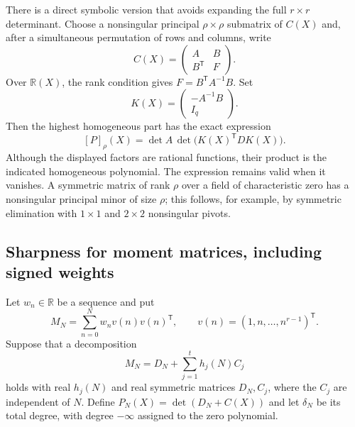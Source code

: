 There is a direct symbolic version that avoids expanding the full
$r\times r$ determinant.  Choose a nonsingular principal
$\rho\times\rho$ submatrix of $C(X)$ and, after a simultaneous
permutation of rows and columns, write
\[
 C(X)=\begin{pmatrix} A&B\\B^{\mathsf T}&F\end{pmatrix}.
\]
Over $\mathbb R(X)$, the rank condition gives $F=B^{\mathsf T}A^{-1}B$.
Set
\begin{equation}\label{deg:generic-kernel}
 K(X)=\begin{pmatrix}-A^{-1}B\\I_q\end{pmatrix}.
\end{equation}
Then the highest homogeneous part has the exact expression
\begin{equation}\label{deg:highest}
 [P]_{\rho}(X)=\det A\,
                  \det\bigl(K(X)^{\mathsf T}DK(X)\bigr).
\end{equation}
Although the displayed factors are rational functions, their product is
the indicated homogeneous polynomial.  The expression remains valid
when it vanishes.  A symmetric matrix of rank $\rho$ over a field of
characteristic zero has a nonsingular principal minor of size $\rho$;
this follows, for example, by symmetric elimination with $1\times1$
and $2\times2$ nonsingular pivots.

\subsection{Sharpness for moment matrices, including signed weights}

Let $w_n\in\mathbb R$ be a sequence and put
\begin{equation}\label{deg:moment}
 M_N=\sum_{n=0}^N w_n v(n)v(n)^{\mathsf T},
 \qquad v(n)=(1,n,\ldots,n^{r-1})^{\mathsf T}.
\end{equation}
Suppose that a decomposition
\begin{equation}\label{deg:decomp}
 M_N=D_N+\sum_{j=1}^t h_j(N)C_j
\end{equation}
holds with real $h_j(N)$ and real symmetric matrices $D_N,C_j$,
where the $C_j$ are independent of $N$.  Define
$P_N(X)=\det(D_N+C(X))$ and let $\delta_N$ be its total degree,
with degree $-\infty$ assigned to the zero polynomial.

